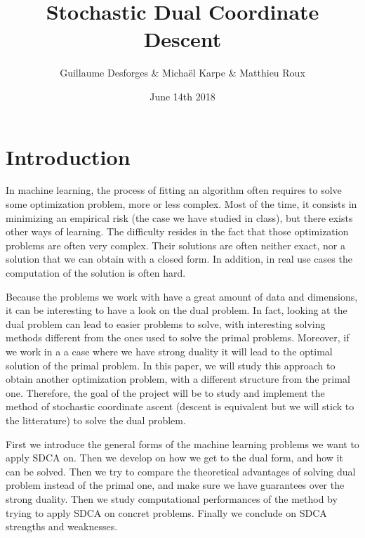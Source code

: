 \documentclass{article}
\title{Stochastic Dual Coordinate Descent}
\author{Guillaume Desforges \& Michaël Karpe \& Matthieu Roux}
\date{June 14th 2018}
\begin{document}
\maketitle

\section{Introduction}

\hspace{2em}
In machine learning, the process of fitting an algorithm often requires to solve some optimization problem, more or less complex.
Most of the time, it consists in minimizing an empirical risk (the case we have studied in class), but there exists other ways of learning.
The difficulty resides in the fact that those optimization problems are often very complex.
Their solutions are often neither exact, nor a solution that we can obtain with a closed form.
In addition, in real use cases the computation of the solution is often hard.

\hspace{2em}
Because the problems we work with have a great amount of data and dimensions, it can be interesting to have a look on the dual problem.
In fact, looking at the dual problem can lead to easier problems to solve, with interesting solving methods different from the ones used to solve the primal problems.
Moreover, if we work in a a case where we have strong duality it will lead to the optimal solution of the primal problem.
In this paper, we will study this approach to obtain another optimization problem, with a different structure from the primal one.
Therefore, the goal of the project will be to study and implement the method of stochastic coordinate ascent (descent is equivalent but we will stick to the litterature) to solve the dual problem.

\hspace{2em}
First we introduce the general forms of the machine learning problems we want to apply SDCA on.
Then we develop on how we get to the dual form, and how it can be solved.
Then we try to compare the theoretical advantages of solving dual problem instead of the primal one, and make sure we have guarantees over the strong duality.
Then we study computational performances of the method by trying to apply SDCA on concret problems.
Finally we conclude on SDCA strengths and weaknesses.
\end{document}
